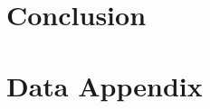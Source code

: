 \documentclass{article}
\theoremstyle{definition}
\theoremstyle{definition}
\theoremstyle{definition}
\theoremstyle{definition}
\begin{document}
\section{Conclusion} \label{conc} 













\pagebreak







\appendix
\captionsetup{labelformat=AppendixTables}


\setcounter{figure}{0}   
\setcounter{table}{0}   

\renewcommand{\thetable}{\arabic{table}}
\renewcommand{\thefigure}{\arabic{figure}}



\section{Data Appendix} \label{data_app}
\end{document}
